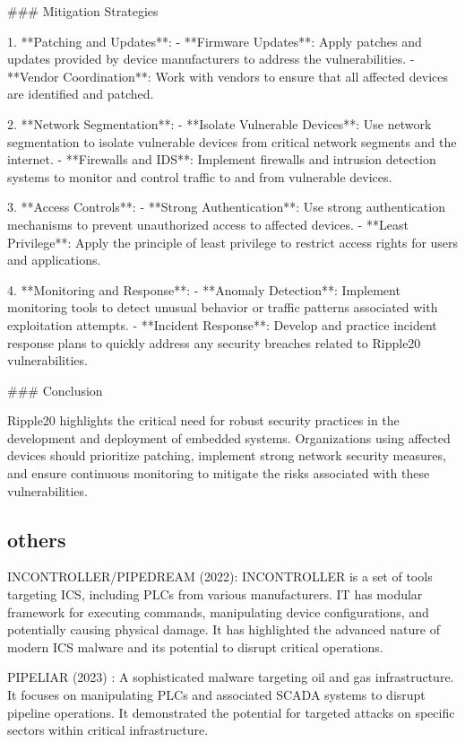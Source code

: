 ### Mitigation Strategies

1. **Patching and Updates**:
   - **Firmware Updates**: Apply patches and updates provided by device manufacturers to address the vulnerabilities.
   - **Vendor Coordination**: Work with vendors to ensure that all affected devices are identified and patched.

2. **Network Segmentation**:
   - **Isolate Vulnerable Devices**: Use network segmentation to isolate vulnerable devices from critical network segments and the internet.
   - **Firewalls and IDS**: Implement firewalls and intrusion detection systems to monitor and control traffic to and from vulnerable devices.

3. **Access Controls**:
   - **Strong Authentication**: Use strong authentication mechanisms to prevent unauthorized access to affected devices.
   - **Least Privilege**: Apply the principle of least privilege to restrict access rights for users and applications.

4. **Monitoring and Response**:
   - **Anomaly Detection**: Implement monitoring tools to detect unusual behavior or traffic patterns associated with exploitation attempts.
   - **Incident Response**: Develop and practice incident response plans to quickly address any security breaches related to Ripple20 vulnerabilities.

### Conclusion

Ripple20 highlights the critical need for robust security practices in the development and deployment of embedded systems. Organizations using affected devices should prioritize patching, implement strong network security measures, and ensure continuous monitoring to mitigate the risks associated with these vulnerabilities.



\subsection{others}
    
    \item INCONTROLLER/PIPEDREAM (2022): INCONTROLLER is a set of tools targeting ICS, including PLCs from various manufacturers. IT has modular framework for executing commands, manipulating device configurations, and potentially causing physical damage.  It has highlighted the advanced nature of modern ICS malware and its potential to disrupt critical operations.
    \item PIPELIAR (2023) : A sophisticated malware targeting oil and gas infrastructure. It focuses on manipulating PLCs and associated SCADA systems to disrupt pipeline operations. It demonstrated the potential for targeted attacks on specific sectors within critical infrastructure.